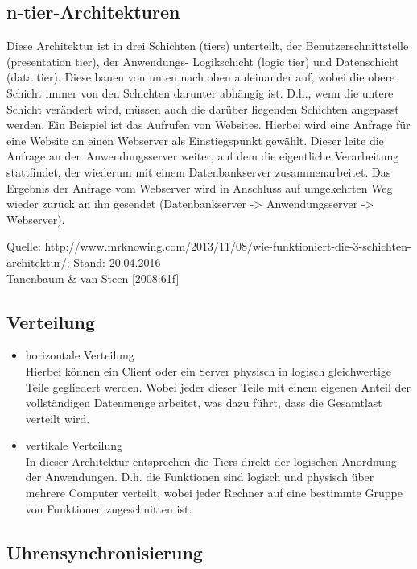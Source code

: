 \documentclass[a4paper]{scrartcl}
\begin{document}
\subsection{n-tier-Architekturen}
Diese Architektur ist in drei Schichten (tiers) unterteilt, der Benutzerschnittstelle (presentation tier), der Anwendungs- Logikschicht (logic tier) und Datenschicht (data tier). Diese bauen von unten nach oben aufeinander auf, wobei die obere Schicht immer von den Schichten darunter abhängig ist. D.h., wenn die untere Schicht verändert wird, müssen auch die darüber liegenden Schichten angepasst werden. Ein Beispiel ist das Aufrufen von Websites. Hierbei wird eine Anfrage für eine Website an einen Webserver als Einstiegspunkt gewählt. Dieser leite die Anfrage an den Anwendungsserver weiter, auf dem die eigentliche Verarbeitung stattfindet, der wiederum mit einem Datenbankserver zusammenarbeitet. Das Ergebnis der Anfrage vom Webserver wird in Anschluss auf umgekehrten Weg wieder zurück an ihn gesendet (Datenbankserver -> Anwendungsserver -> Webserver).

Quelle: http://www.mrknowing.com/2013/11/08/wie-funktioniert-die-3-schichten-architektur/; Stand: 20.04.2016 \\ Tanenbaum \& van Steen [2008:61f]

\subsection{Verteilung}
	\begin{itemize}
		\item horizontale Verteilung \\
		Hierbei können ein Client oder ein Server physisch in logisch gleichwertige Teile gegliedert werden. Wobei jeder dieser Teile mit einem eigenen Anteil der vollständigen Datenmenge arbeitet, was dazu führt, dass die Gesamtlast verteilt wird.
		
		\item vertikale Verteilung \\
		In dieser Architektur entsprechen die Tiers direkt der logischen Anordnung der Anwendungen. D.h. die Funktionen sind logisch und physisch über mehrere Computer verteilt, wobei jeder Rechner auf eine bestimmte Gruppe von Funktionen zugeschnitten ist.
	\end{itemize}

\subsection{Uhrensynchronisierung}
\end{document}
